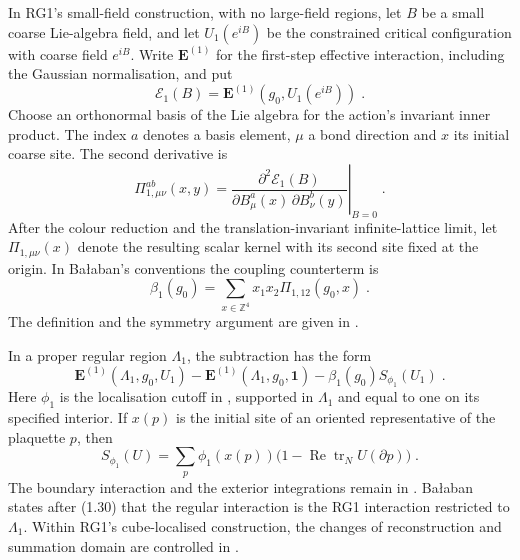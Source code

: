 \documentclass[11pt]{article}
\newcommand{\tr}{\operatorname{tr}}
\newcommand{\id}{\mathbf 1}
\begin{document}
In RG1's small-field construction, with no large-field regions, let $B$ be a small coarse Lie-algebra field, and let $U_1(e^{iB})$ be the constrained critical configuration with coarse field $e^{iB}$. Write $\mathbf E^{(1)}$ for the first-step effective interaction, including the Gaussian normalisation, and put
\begin{equation}
    \mathcal E_1(B)=\mathbf E^{(1)}(g_0,U_1(e^{iB}))\;.
\end{equation}
Choose an orthonormal basis of the Lie algebra for the action's invariant inner product. The index $a$ denotes a basis element, $\mu$ a bond direction and $x$ its initial coarse site. The second derivative is
\begin{equation}
    \Pi_{1,\mu\nu}^{ab}(x,y)
        =\left.
            \frac{\partial^2\mathcal E_1(B)}
                {\partial B_\mu^a(x)\,\partial B_\nu^b(y)}
          \right|_{B=0}\;.
\end{equation}
After the colour reduction and the translation-invariant infinite-lattice limit, let $\Pi_{1,\mu\nu}(x)$ denote the resulting scalar kernel with its second site fixed at the origin. In Ba{\l}aban's conventions the coupling counterterm is
\begin{equation}
    \beta_1(g_0)=\sum_{x\in\mathbb Z^4}x_1x_2\Pi_{1,12}(g_0,x)\;.
\end{equation}
The definition and the symmetry argument are given in \cite[(1.20)--(1.22), (5.37)--(5.43)]{BalabanRG1}.

In a proper regular region $\Lambda_1$, the subtraction has the form
\begin{equation}\label{eq:balaban-regular-subtraction}
    \mathbf E^{(1)}(\Lambda_1,g_0,U_1)
        -\mathbf E^{(1)}(\Lambda_1,g_0,\id)
        -\beta_1(g_0)S_{\phi_1}(U_1)\;.
\end{equation}
Here $\phi_1$ is the localisation cutoff in \cite[(1.27)]{BalabanCRE}, supported in $\Lambda_1$ and equal to one on its specified interior. If $x(p)$ is the initial site of an oriented representative of the plaquette $p$, then
\begin{equation}
    S_{\phi_1}(U)=
        \sum_p\phi_1(x(p))
            \bigl(1-\operatorname{Re}\tr_N U(\partial p)\bigr)\;.
\end{equation}
The boundary interaction and the exterior integrations remain in \cite[(1.29)--(1.30)]{BalabanCRE}. Ba{\l}aban states after (1.30) that the regular interaction is the RG1 interaction restricted to $\Lambda_1$. Within RG1's cube-localised construction, the changes of reconstruction and summation domain are controlled in \cite[(4.35)--(4.37)]{BalabanRG1}.
\end{document}
